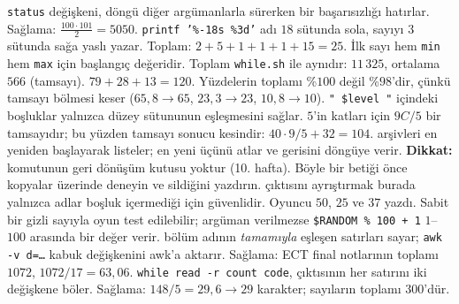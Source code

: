 \texttt{status} değişkeni, döngü diğer argümanlarla sürerken bir başarısızlığı hatırlar.
Sağlama: $\frac{100 \cdot 101}{2} = 5050$.
\texttt{printf '\%-18s \%3d'} adı $18$ sütunda sola, sayıyı $3$ sütunda sağa yaslı yazar. Toplam: $2 + 5 + 1 + 1 + 1 + 15 = 25$.
İlk sayı hem \texttt{min} hem \texttt{max} için başlangıç değeridir. Toplam \texttt{while.sh} ile aynıdır: $11\,325$, ortalama $566$ (tamsayı).
$79 + 28 + 13 = 120$. Yüzdelerin toplamı \%$100$ değil \%$98$'dir, çünkü tamsayı bölmesi keser ($65{,}8 \to 65$, $23{,}3 \to 23$, $10{,}8 \to 10$). \texttt{" \$level "} içindeki boşluklar yalnızca düzey sütununun eşleşmesini sağlar.
$5$'in katları için $9C/5$ bir tamsayıdır; bu yüzden tamsayı sonucu kesindir: $40 \cdot 9 / 5 + 32 = 104$.
 arşivleri en yeniden başlayarak listeler;  en yeni üçünü atlar ve gerisini döngüye verir. \textbf{Dikkat:}  komutunun geri dönüşüm kutusu yoktur (10. hafta). Böyle bir betiği önce kopyalar üzerinde deneyin ve sildiğini yazdırın.  çıktısını ayrıştırmak burada yalnızca adlar boşluk içermediği için güvenlidir.
Oyuncu $50$, $25$ ve $37$ yazdı. Sabit bir gizli sayıyla oyun test edilebilir; argüman verilmezse \texttt{\$RANDOM \% 100 + 1} $1$--$100$ arasında bir değer verir.
 bölüm adının \emph{tamamıyla} eşleşen satırları sayar; \texttt{awk -v d=\ldots} kabuk değişkenini awk'a aktarır. Sağlama: ECT final notlarının toplamı $1072$, $1072/17 = 63{,}06$.
\texttt{while read -r count code},  çıktısının her satırını iki değişkene böler. Sağlama: $148/5 = 29{,}6 \to 29$ karakter; sayıların toplamı $300$'dür.
